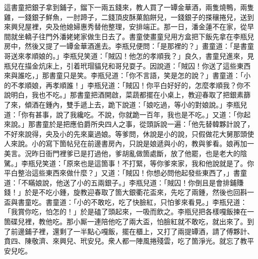 這書童把銀子拿到鋪子，鎦下一兩五錢來，教人買了一罈金華酒，兩隻燒鴨，兩隻雞，一錢銀子鮮魚，一肘蹄子，二錢頂皮酥菓餡餅兒，一錢銀子的搽穰捲兒，送到來興兒屋裡，央及他媳婦惠秀替他整理，安排端正。那一日，潘金蓮不在家，從早間就坐轎子往門外潘姥姥家做生日去了。書童使畫童兒用方盒把下飯先拿在李瓶兒房中，然後又提了一罈金華酒進去。李瓶兒便問：「是那裡的？」畫童道：「是書童哥送來孝順娘的。」李瓶兒笑道：「賊囚！他怎的孝順我？」良久，書童兒進來，見瓶兒在描金炕床上，引着玳瑁貓兒和哥兒耍子。因說道：「賊囚！你送了這些東西來與誰吃，」那書童只是笑。李瓶兒道：「你不言語，笑是怎的說？」書童道：「小的不孝順娘，再孝順誰！」{}李瓶兒道：「賊囚！你平白好好的，怎麼孝順我？你不說明白，我也不吃。」那書童把酒開啟，菜蔬都擺在小桌上，教迎春取了把銀素篩了來，傾酒在鍾內，雙手遞上去，跪下說道：「娘吃過，等小的對娘說。」李瓶兒道：「你有甚事，說了我纔吃。不說，你就跪一百年，我也是不吃。」又道：「你起來說。」那書童於是把應伯爵所央四人之事，從頭訴說一遍：「他先替韓夥計說了，不好來說得，央及小的先來稟過娘。等爹問，休說是小的說，只假做花大舅那頭使人來說。小的寫下箇帖兒在前邊書房內，只說是娘遞與小的，教與爹看。娘再加一美言。況昨日衙門裡爹已是打過他，爹胡亂做箇處斷，放了他罷，也是老大的陰騭。」李瓶兒笑道：「原來也是這箇事！不打緊，等你爹來家，我和他說就是了。你平白整治這些東西來做什麼？」又道：「賊囚！你想必問他起發些東西了，」書童道：「不瞞娘說，他送了小的五兩銀子。」李瓶兒道：「賊囚！你倒且是會排鋪賺錢！」於是不吃小鍾，旋教迎春取了箇大銀衢花盃來，先吃了兩鍾，然後也回斟一盃與書童吃。書童道：「小的不敢吃，吃了快臉紅，只怕爹來看見。」李瓶兒道：「我賞你吃，怕怎的！」於是磕了頭起來，一吸而飲之。李瓶兒把各樣嘎飯揀在一箇碟兒裡，教他吃。那小厮一連陪他吃了兩大盃，怕臉紅就不敢吃，就出來了。到了前邊鋪子裡，還剩了一半點心嘎飯，擺在櫃上，又打了兩提罈酒，請了傅夥計、賁四、陳敬濟、來興兒、玳安兒。衆人都一陣風捲殘雲，吃了箇淨光。就忘了教平安兒吃。

